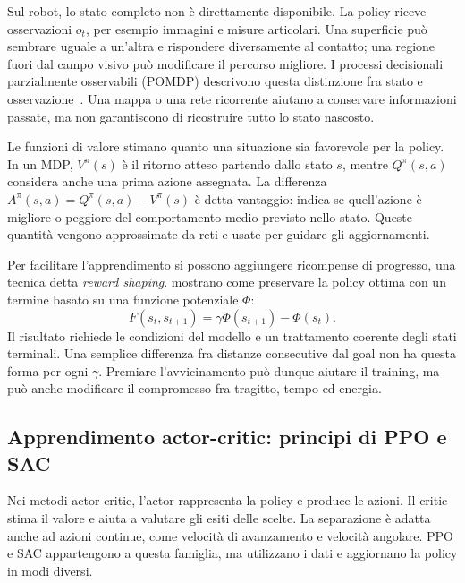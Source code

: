 Sul robot, lo stato completo non è direttamente disponibile. La policy riceve osservazioni $o_t$, per esempio immagini e misure articolari. Una superficie può sembrare uguale a un'altra e rispondere diversamente al contatto; una regione fuori dal campo visivo può modificare il percorso migliore. I processi decisionali parzialmente osservabili (POMDP) descrivono questa distinzione fra stato e osservazione~\citep{Kaelbling1998POMDP}. Una mappa o una rete ricorrente aiutano a conservare informazioni passate, ma non garantiscono di ricostruire tutto lo stato nascosto.

Le funzioni di valore stimano quanto una situazione sia favorevole per la policy. In un MDP, $V^\pi(s)$ è il ritorno atteso partendo dallo stato $s$, mentre $Q^\pi(s,a)$ considera anche una prima azione assegnata. La differenza $A^\pi(s,a)=Q^\pi(s,a)-V^\pi(s)$ è detta vantaggio: indica se quell'azione è migliore o peggiore del comportamento medio previsto nello stato. Queste quantità vengono approssimate da reti e usate per guidare gli aggiornamenti.

Per facilitare l'apprendimento si possono aggiungere ricompense di progresso, una tecnica detta \emph{reward shaping}. \citet{Ng1999Shaping} mostrano come preservare la policy ottima con un termine basato su una funzione potenziale $\Phi$:
\begin{equation}
    F(s_t,s_{t+1})=\gamma\Phi(s_{t+1})-\Phi(s_t).
    \label{eq:sota-shaping}
\end{equation}
Il risultato richiede le condizioni del modello e un trattamento coerente degli stati terminali. Una semplice differenza fra distanze consecutive dal goal non ha questa forma per ogni $\gamma$. Premiare l'avvicinamento può dunque aiutare il training, ma può anche modificare il compromesso fra tragitto, tempo ed energia.

\subsection{Apprendimento actor-critic: principi di PPO e SAC}

Nei metodi actor-critic, l'actor rappresenta la policy e produce le azioni. Il critic stima il valore e aiuta a valutare gli esiti delle scelte. La separazione è adatta anche ad azioni continue, come velocità di avanzamento e velocità angolare. PPO e SAC appartengono a questa famiglia, ma utilizzano i dati e aggiornano la policy in modi diversi.

